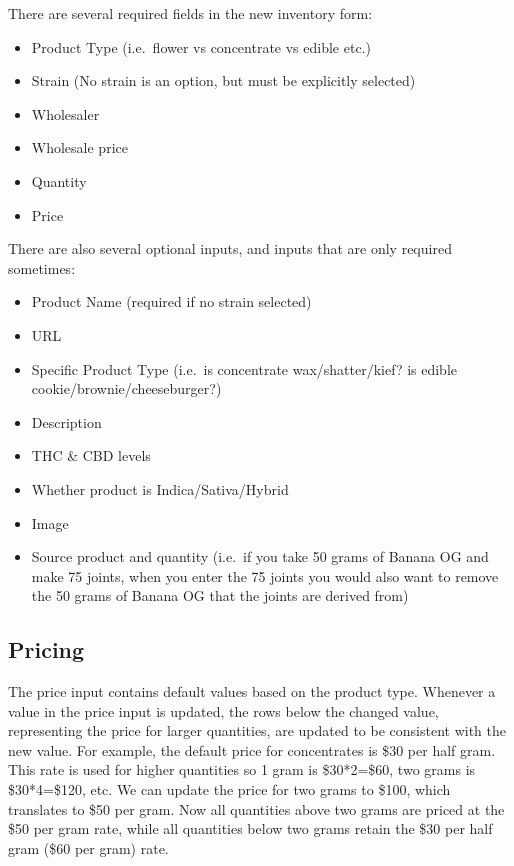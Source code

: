 \documentclass[]{book}
\theoremstyle{definition}
\theoremstyle{definition}
\theoremstyle{definition}
\theoremstyle{remark}
\begin{document}
There are several required fields in the new inventory form:

\begin{itemize}
\item
  Product Type (i.e.~flower vs concentrate vs edible etc.)
\item
  Strain (No strain is an option, but must be explicitly selected)
\item
  Wholesaler
\item
  Wholesale price
\item
  Quantity
\item
  Price
\end{itemize}

There are also several optional inputs, and inputs that are only
required sometimes:

\begin{itemize}
\item
  Product Name (required if no strain selected)
\item
  URL
\item
  Specific Product Type (i.e.~is concentrate wax/shatter/kief? is edible
  cookie/brownie/cheeseburger?)
\item
  Description
\item
  THC \& CBD levels
\item
  Whether product is Indica/Sativa/Hybrid
\item
  Image
\item
  Source product and quantity (i.e.~if you take 50 grams of Banana OG
  and make 75 joints, when you enter the 75 joints you would also want
  to remove the 50 grams of Banana OG that the joints are derived from)
\end{itemize}

\subsection{Pricing}\label{pricing}

The price input contains default values based on the product type.
Whenever a value in the price input is updated, the rows below the
changed value, representing the price for larger quantities, are updated
to be consistent with the new value. For example, the default price for
concentrates is \$30 per half gram. This rate is used for higher
quantities so 1 gram is \$30*2=\$60, two grams is \$30*4=\$120, etc. We
can update the price for two grams to \$100, which translates to \$50
per gram. Now all quantities above two grams are priced at the \$50 per
gram rate, while all quantities below two grams retain the \$30 per half
gram (\$60 per gram) rate.
\end{document}
